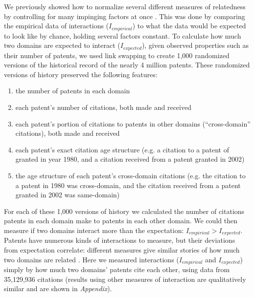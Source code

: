 \documentclass{dsj}
\begin{document}
We previously showed how to normalize several different measures of relatedness by controlling for many impinging factors at once \cite{Alstott2017}. This was done by comparing the empirical data of interactions ($I_{empirical}$) to what the data would be expected to look like by chance, holding several factors constant. To calculate how much two domains are expected to interact ($I_{expected}$), given observed properties such as their number of patents, we used link swapping to create 1,000 randomized versions of the historical record of the nearly 4 million patents. These randomized versions of history preserved the following features:


\begin{enumerate}
    \item the number of patents in each domain
    \item each patent's number of citations, both made and received
    \item each patent's portion of citations to patents in other domains (``cross-domain'' citations), both made and received
    \item each patent's exact citation age structure (e.g. a citation to a patent of granted in year 1980, and a citation received from a patent granted in 2002) 
    \item the age structure of each patent's cross-domain citations (e.g. the citation to a patent in 1980 was cross-domain, and the citation received from a patent granted in 2002 was same-domain)
\end{enumerate}

For each of these 1,000 versions of history we calculated the number of citations patents in each domain make to patents in each other domain. We could then measure if two domains interact more than the expectation: $I_{empirical}>I_{expected}$. Patents have numerous kinds of interactions to measure, but their deviations from expectation correlate: different measures give similar stories of how much two domains are related \cite{Alstott2017}. Here we measured interactions ($I_{empirical}$  and $I_{expected}$) simply by how much two domains' patents cite each other, using data from 35,129,936 citations (results using other measures of interaction are qualitatively similar and are shown in \textit{Appendix}).
\end{document}

